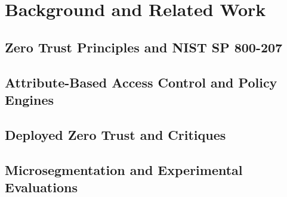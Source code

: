 \chapter{Background and Related Work}\label{ch:background}

\section{Zero Trust Principles and NIST SP 800-207}

\section{Attribute-Based Access Control and Policy Engines}

\section{Deployed Zero Trust and Critiques}

\section{Microsegmentation and Experimental Evaluations}

